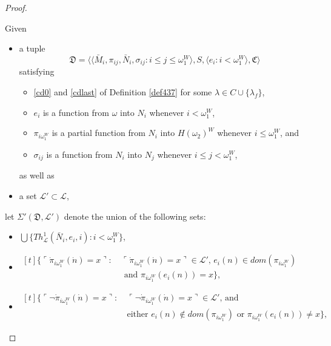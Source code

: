 \documentclass[12pt]{article}
\numberwithin{equation}{section}
\begin{document}
\begin{proof}
\begin{defi}\label{def439}
Given 
\begin{itemize}
    \item a tuple
    \begin{equation*}
        \mathfrak{D} = \langle \langle \bar{M}_i, \pi_{ij},  \bar{N}_i, \sigma_{ij} : i \leq j \leq \omega_1^{W} \rangle, S, \langle e_i : i < \omega_1^W \rangle, \mathfrak{C} \rangle
    \end{equation*}
    satisfying 
    \begin{itemize}[label=$\circ$]
        \item \ref{cd0} and \ref{cdlast} of Definition \ref{def437} for some $\lambda \in C \cup \{\lambda_f\}$, 
        \item $e_i$ is a function from $\omega$ into $N_i$ whenever $i < \omega_1^W$, 
        \item $\pi_{i\omega_1^W}$ is a partial function from $N_i$ into $H(\omega_2)^W$ whenever $i \leq \omega_1^W$, and
        \item $\sigma_{ij}$ is a function from $N_i$ into $N_j$ whenever $i \leq j < \omega_1^W$,
    \end{itemize}
    as well as 
    \item a set $\mathcal{L}' \subset \mathcal{L}$,
\end{itemize}
let $\Sigma'(\mathfrak{D}, \mathcal{L}')$ denote the union of the following sets:
\begin{itemize}
    \item $\bigcup \{Th^{1}_{\mathcal{L}}(\bar{N}_i, e_i, i) : i < \omega_1^W\}$,
    \item 
    \!
    $\begin{aligned}[t]
        \{\ulcorner \dot{\pi}_{i\omega_1^W}(\dot{n}) = x \urcorner : \ & \ulcorner \dot{\pi}_{i\omega_1^W}(\dot{n}) = x \urcorner \in \mathcal{L}' \text{, } e_i(n) \in dom(\pi_{i\omega_1^W}) \\ 
        & \text{ and } \pi_{i\omega_1^W}(e_i(n)) = x\} \text{,}
    \end{aligned}$
    \item 
    \!
    $\begin{aligned}[t]
        \{\ulcorner \neg \dot{\pi}_{i\omega_1^W}(\dot{n}) = x \urcorner : \ & \ulcorner \neg \dot{\pi}_{i\omega_1^W}(\dot{n}) = x \urcorner \in \mathcal{L}' \text{, and} \\
        & \text{either } e_i(n) \not\in dom(\pi_{i\omega_1^W}) \text{ or } \pi_{i\omega_1^W}(e_i(n)) \neq x\} \text{,}
    \end{aligned}$

\end{itemize}
\end{defi}
\end{proof}
\end{document}
